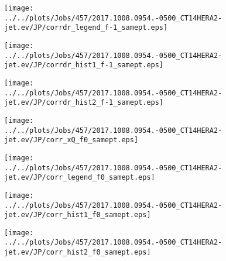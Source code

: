 \documentclass[12pt]{article}
\begin{document}
\begin{figure}
\texttt{[image: ../../plots/Jobs/457/2017.1008.0954.-0500\_CT14HERA2-jet.ev/JP/corrdr\_legend\_f-1\_samept.eps]}
\caption{}
\end{figure}\newpage\clearpage
\begin{figure}
\texttt{[image: ../../plots/Jobs/457/2017.1008.0954.-0500\_CT14HERA2-jet.ev/JP/corrdr\_hist1\_f-1\_samept.eps]}
\caption{}
\end{figure}\newpage\clearpage
\begin{figure}
\texttt{[image: ../../plots/Jobs/457/2017.1008.0954.-0500\_CT14HERA2-jet.ev/JP/corrdr\_hist2\_f-1\_samept.eps]}
\caption{}
\end{figure}\newpage\clearpage
\begin{figure}
\texttt{[image: ../../plots/Jobs/457/2017.1008.0954.-0500\_CT14HERA2-jet.ev/JP/corr\_xQ\_f0\_samept.eps]}
\caption{}
\end{figure}\newpage\clearpage
\begin{figure}
\texttt{[image: ../../plots/Jobs/457/2017.1008.0954.-0500\_CT14HERA2-jet.ev/JP/corr\_legend\_f0\_samept.eps]}
\caption{}
\end{figure}\newpage\clearpage
\begin{figure}
\texttt{[image: ../../plots/Jobs/457/2017.1008.0954.-0500\_CT14HERA2-jet.ev/JP/corr\_hist1\_f0\_samept.eps]}
\caption{}
\end{figure}\newpage\clearpage
\begin{figure}
\texttt{[image: ../../plots/Jobs/457/2017.1008.0954.-0500\_CT14HERA2-jet.ev/JP/corr\_hist2\_f0\_samept.eps]}
\caption{}
\end{figure}\newpage\clearpage
\end{document}
